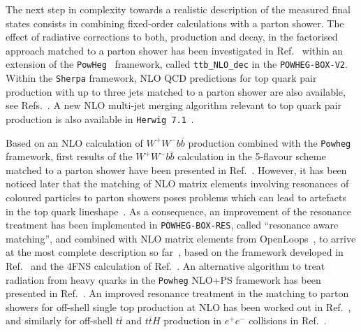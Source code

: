 The next step in complexity towards a realistic description of the
measured final states consists in combining fixed-order calculations with a parton shower. 
The effect of radiative corrections to both, production and decay, in the factorised
approach matched to a parton shower has been investigated in Ref.~\cite{Campbell:2014kua}
within an extension of the {\tt PowHeg}~\cite{Frixione:2007vw,Alioli:2010xd} framework, called {\tt ttb\_NLO\_dec}
in the {\tt POWHEG-BOX-V2}.
Within the {\tt Sherpa} framework, NLO QCD predictions for top quark
pair production with up to three jets matched to a parton shower are
also available, see Refs.~\cite{Hoeche:2014qda,Hoche:2016elu}.
A new NLO multi-jet merging algorithm relevant to top quark pair
production is also available in {\tt Herwig\,7.1}~\cite{Bellm:2017idv}.

Based on an NLO calculation of $W^+W^- b\bar{b}$ production combined
with the {\tt Powheg} framework, first results of the $W^+W^-
b\bar{b}$ calculation in the 5-flavour scheme matched to a parton
shower have been presented in Ref.~\cite{Garzelli:2014dka}. 
However, it has been noticed later that the matching of NLO matrix elements
involving resonances of coloured particles to parton showers poses
problems which can lead to artefacts in the top quark lineshape~\cite{Jezo:2015aia}.
As a consequence, an improvement of the resonance treatment has been
implemented in {\tt POWHEG-BOX-RES}, called ``resonance aware matching'', 
and combined with NLO matrix elements from OpenLoops~\cite{Cascioli:2011va}, to arrive at 
the most complete description so far~\cite{Jezo:2016ujg}, based on the
framework developed in Ref.~\cite{Jezo:2015aia} and the 4FNS calculation of
Ref.~\cite{Cascioli:2013wga}. An alternative algorithm to treat
radiation from heavy quarks in the {\tt Powheg} NLO+PS framework has been
presented in Ref.~\cite{Buonocore:2017lry}.
An improved resonance treatment in the matching to parton showers for off-shell single top production at NLO
has been worked out in Ref.~\cite{Frederix:2016rdc}, and similarly for off-shell
$t\bar{t}$ and $t\bar{t}H$ production in $e^+e^-$ collisions in Ref.~\cite{Nejad:2016bci}.

\medskip

